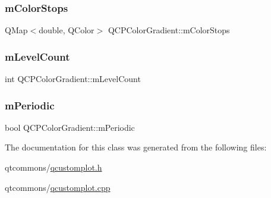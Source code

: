 \subsubsection{\texorpdfstring{mColorStops}{mColorStops}}
{\footnotesize\ttfamily Q\+Map$<$double, Q\+Color$>$ Q\+C\+P\+Color\+Gradient\+::m\+Color\+Stops\hspace{0.3cm}{\ttfamily [protected]}}

\mbox{\label{class_q_c_p_color_gradient_a98fb68e359904b2c991fcae3e38a211a}} 
\subsubsection{\texorpdfstring{mLevelCount}{mLevelCount}}
{\footnotesize\ttfamily int Q\+C\+P\+Color\+Gradient\+::m\+Level\+Count\hspace{0.3cm}{\ttfamily [protected]}}

\mbox{\label{class_q_c_p_color_gradient_a4b07deeb20ca1ee2d5ea7e01bf0420af}} 
\subsubsection{\texorpdfstring{mPeriodic}{mPeriodic}}
{\footnotesize\ttfamily bool Q\+C\+P\+Color\+Gradient\+::m\+Periodic\hspace{0.3cm}{\ttfamily [protected]}}



The documentation for this class was generated from the following files\+:\begin{DoxyCompactItemize}
\item 
qtcommons/\mbox{\hyperlink{qcustomplot_8h}{qcustomplot.\+h}}\item 
qtcommons/\mbox{\hyperlink{qcustomplot_8cpp}{qcustomplot.\+cpp}}\end{DoxyCompactItemize}
